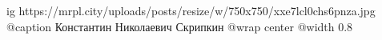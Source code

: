  
 
 
 
 

\ifcmt
  ig https://mrpl.city/uploads/posts/resize/w/750x750/xxe7lcl0chs6pnza.jpg
	@caption Константин Николаевич Скрипкин
  @wrap center
  @width 0.8
\fi
